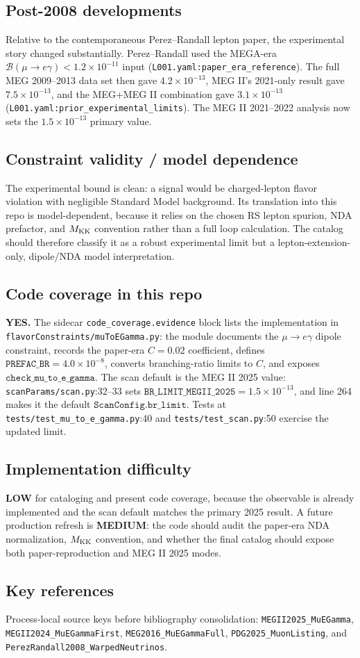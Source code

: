 \subsection*{Post-2008 developments}
Relative to the contemporaneous Perez--Randall lepton paper, the experimental
story changed substantially.
Perez--Randall used the MEGA-era
\(\mathcal{B}(\mu\to e\gamma)<1.2\times10^{-11}\) input
(\texttt{L001.yaml:paper\_era\_reference}).  The full MEG 2009--2013 data set
then gave \(4.2\times10^{-13}\), MEG II's 2021-only result gave
\(7.5\times10^{-13}\), and the MEG+MEG II combination gave
\(3.1\times10^{-13}\) (\texttt{L001.yaml:prior\_experimental\_limits}).  The
MEG II 2021--2022 analysis now sets the \(1.5\times10^{-13}\) primary value.

\subsection*{Constraint validity / model dependence}
The experimental bound is clean: a signal would be charged-lepton flavor
violation with negligible Standard Model background.  Its translation into this
repo is model-dependent, because it relies on the chosen RS lepton spurion, NDA
prefactor, and \(M_{\rm KK}\) convention rather than a full loop calculation.
The catalog should therefore classify it as a robust experimental limit but a
lepton-extension-only, dipole/NDA model interpretation.

\subsection*{Code coverage in this repo}
\textbf{YES.}  The sidecar \texttt{code\_coverage.evidence} block lists the
implementation in \texttt{flavorConstraints/muToEGamma.py}: the module
documents the \(\mu\to e\gamma\) dipole constraint, records the paper-era
\(C=0.02\) coefficient, defines
\(\texttt{PREFAC\_BR}=4.0\times10^{-8}\), converts branching-ratio limits to
\(C\), and exposes \(\texttt{check\_mu\_to\_e\_gamma}\).  The scan default is the
MEG II 2025 value:
\texttt{scanParams/scan.py}:32--33 sets
\(\texttt{BR\_LIMIT\_MEGII\_2025}=1.5\times10^{-13}\), and line 264 makes it the
default \(\texttt{ScanConfig.br\_limit}\).  Tests at
\texttt{tests/test\_mu\_to\_e\_gamma.py}:40 and
\texttt{tests/test\_scan.py}:50 exercise the updated limit.

\subsection*{Implementation difficulty}
\textbf{LOW} for cataloging and present code coverage, because the observable
is already implemented and the scan default matches the primary 2025 result.  A
future production refresh is \textbf{MEDIUM}: the code should audit the
paper-era NDA normalization, \(M_{\rm KK}\) convention, and whether the final
catalog should expose both paper-reproduction and MEG II 2025 modes.

\subsection*{Key references}
Process-local source keys before bibliography consolidation:
\texttt{MEGII2025\_MuEGamma}, \texttt{MEGII2024\_MuEGammaFirst},
\texttt{MEG2016\_MuEGammaFull}, \texttt{PDG2025\_MuonListing}, and
\texttt{PerezRandall2008\_WarpedNeutrinos}.
